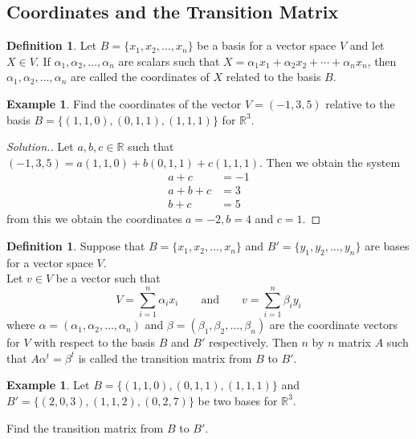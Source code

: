 \documentclass[11pt,a4paper]{article}
\theoremstyle{definition}
\newtheorem{defn}[thm]{Definition}
\newtheorem{exa}[thm]{Example}
\newenvironment{solution}
  {\renewcommand{\qedsymbol}{}\begin{proof}[\textit{Solution}.]}
  {\end{proof}}
\begin{document}
\subsection{Coordinates and the Transition Matrix}

\begin{defn}
Let $B=\{x_1,x_2,\dots,x_n\}$ be a basis for a vector space $V$ and let $X\in V$. If $\alpha_1, \alpha_2,\dots, \alpha_n$ are scalars such that $X=\alpha_1x_1+\alpha_2x_2+\cdots+\alpha_nx_n$, then $\alpha_1, \alpha_2,\dots, \alpha_n$ are called the coordinates of $X$ related to the basis $B$.
\end{defn}


\begin{exa}
Find the coordinates of the vector $V=(-1,3,5)$ relative to the basis $B=\{(1,1,0), (0,1,1), (1,1,1)\}$ for $\mathbb{R}^3$.
\end{exa}


\begin{solution}
Let $a,b,c\in \mathbb{R}$ such that $(-1,3,5)=a(1,1,0)+b(0,1,1)+c(1,1,1)$. 
Then we obtain the system
\begin{align*}
a+c &=-1\\
a+b+c &=3\\
b+c &=5
\end{align*}
from this we obtain the coordinates $a=-2, b=4$ and $c=1$.
\end{solution}


\begin{defn}
Suppose that $B=\{x_1,x_2,\dots,x_n\}$ and $B'=\{y_1,y_2,\dots,y_n\}$ are bases for a vector space $V$.\\ Let $v\in V$ be a vector such that $$V=\sum^n_{i=1}\alpha_ix_i\qquad\text{and}\qquad v=\sum^n_{i=1}\beta_iy_i$$ where $\alpha =(\alpha_1,\alpha_2,\dots,\alpha_n)$ and $\beta=(\beta_1,\beta_2,\dots,\beta_n)$ are the coordinate vectors for $V$ with respect to the basis $B$ and $B'$ respectively. Then $n$ by $n$ matrix $A$ such that $A\alpha^t=\beta^t$ is called the transition matrix from $B$ to $B'$.
\end{defn}


\begin{exa}
Let $B=\{(1,1,0), (0,1,1), (1,1,1)\}$ and $B'=\{(2,0,3), (1,1,2), (0,2,7)\}$ be two bases for $\mathbb{R}^3$.

Find the transition matrix from $B$ to $B'$.
\end{exa}
\end{document}
